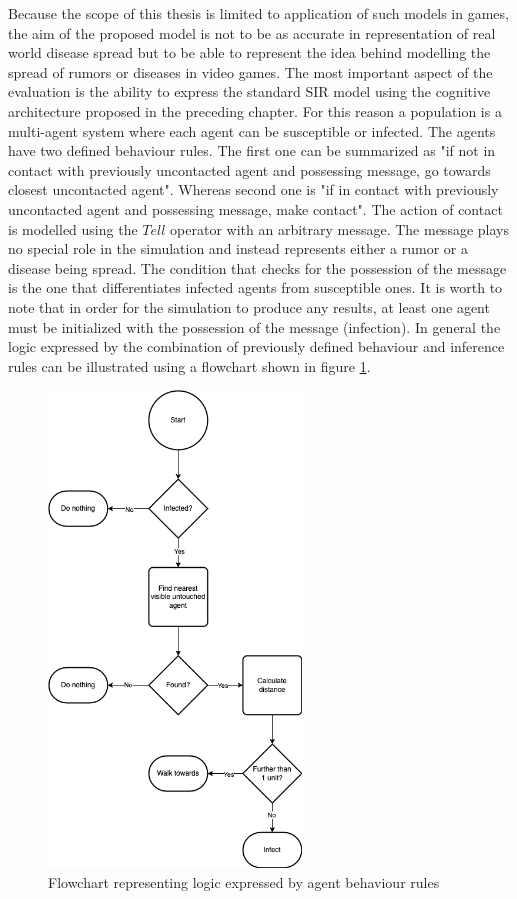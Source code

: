 Because the scope of this thesis is limited to application of such models in games, the aim of the proposed model is not to be as accurate in representation of real world disease spread but to be able to represent the idea behind modelling the spread of rumors or diseases in video games.
The most important aspect of the evaluation is the ability to express the standard SIR model using the cognitive architecture proposed in the preceding chapter.
For this reason a population is a multi-agent system where each agent can be susceptible or infected.
The agents have two defined behaviour rules.
The first one can be summarized as "if not in contact with previously uncontacted agent and possessing message, go towards closest uncontacted agent".
Whereas second one is "if in contact with previously uncontacted agent and possessing message, make contact".
The action of contact is modelled using the $Tell$ operator with an arbitrary message.
The message plays no special role in the simulation and instead represents either a rumor or a disease being spread.
The condition that checks for the possession of the message is the one that differentiates infected agents from susceptible ones.
It is worth to note that in order for the simulation to produce any results, at least one agent must be initialized with the possession of the message (infection).
In general the logic expressed by the combination of previously defined behaviour and inference rules can be illustrated using a flowchart shown in figure \ref{fig:sir_logic.drawio.png}.

\begin{figure}[h]
    \centering
    \includegraphics[width=0.6\textwidth]{images/chapter2/sir_logic.drawio.png}
    \caption{Flowchart representing logic expressed by agent behaviour rules}\label{fig:sir_logic.drawio.png}
\end{figure}

